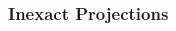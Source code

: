\begin{frame}[t]\frametitle{Inexact Projections}\bigskip   
\begin{figure}[H]
  \begin{subfigmatrix}{3}

\end{subfigmatrix}
\end{figure}
\end{frame}

